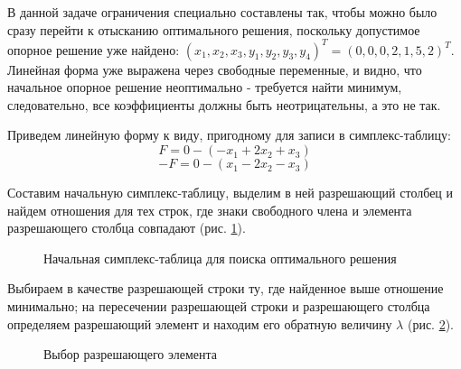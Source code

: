 \documentclass[a4paper,12pt]{report}
\begin{document}
В данной задаче ограничения специально составлены так, чтобы можно было сразу перейти к отысканию оптимального решения, поскольку допустимое опорное решение уже найдено: $(x_{1}, x_{2}, x_{3}, y_{1}, y_{2}, y_{3}, y_{4})^{T} = (0, 0, 0, 2, 1, 5, 2)^{T}$. Линейная форма уже выражена через свободные переменные, и видно, что начальное опорное решение неоптимально - требуется найти минимум, следовательно, все коэффициенты должны быть неотрицательны, а это не так.

Приведем линейную форму к виду, пригодному для записи в симплекс-таблицу:
\begin{equation*}
F = 0 - (-x_{1} + 2x_{2} + x_{3})
\end{equation*}
\begin{equation*}
-F = 0 - (x_{1} - 2x_{2} - x_{3})
\end{equation*}

Составим начальную симплекс-таблицу, выделим в ней разрешающий столбец и найдем отношения для тех строк, где знаки свободного члена и элемента разрешающего столбца совпадают (рис. \ref{fig:lp_find_optsol_1}).

\begin{figure}[ht]
\caption{Начальная симплекс-таблица для поиска оптимального решения}
\label{fig:lp_find_optsol_1}
\end{figure}

Выбираем в качестве разрешающей строки ту, где найденное выше отношение минимально; на пересечении разрешающей строки и разрешающего столбца определяем разрешающий элемент и находим его обратную величину $\lambda$ (рис. \ref{fig:lp_find_optsol_2}).

\begin{figure}[ht]
\caption{Выбор разрешающего элемента}
\label{fig:lp_find_optsol_2}
\end{figure}
\end{document}
